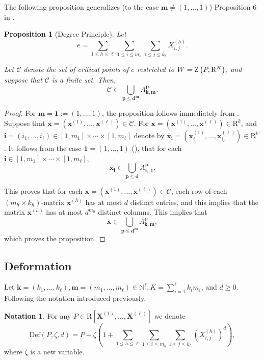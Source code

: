 \documentclass{amsart}
\newtheorem{proposition}{Proposition}
\theoremstyle{definition}
\newtheorem{notation}{Notation}
\theoremstyle{remark}
\numberwithin{equation}{section}
\begin{document}
The following proposition generalizes (to the case ${\mathbf{m}} \neq (1,\ldots,1)$) 
Proposition 6 in \cite{BC2013}. 
\begin{proposition}[Degree Principle]
  \label{prop:half-degree}
  Let 
  \[
  e =\sum_{1 \leq h \leq \ell} \sum_{1 \leq i \leq m_h}\sum_{1 \leq j \leq k_h}
X^{(h)}_{i,j}. 
\]

Let $\mathcal{C}$ denote the set of critical points of $e$ restricted to 
$W= {{\rm Z}} \left(P, {\mathrm{R}}^{K}\right)$, and suppose that $\mathcal{C}$ is a finite set. Then, 
\[
\mathcal{C} \subset \bigcup_{\mathbf{p} \leq {\mathbf{d}}^{\mathbf{m}}} A^{\mathbf{p}}_{{\mathbf{k}},{\mathbf{m}}}.
\] 
\end{proposition}
\begin{proof}
For ${\mathbf{m}}= \mathbf{1} := (1,\ldots,1) $, the proposition follows immediately from \cite[Proposition 6]{BC2013}.
Suppose that 
${\mathbf{x}} = ({\mathbf{x}}^{(1)},\ldots,{\mathbf{x}}^{(\ell)}) \in \mathcal{C}$. 
For ${\mathbf{x}} = ({\mathbf{x}}^{(1)},\ldots,{\mathbf{x}}^{(\ell)}) \in {\mathrm{R}}^k$,
and $\mathbf{i} = (i_1,\ldots,i_\ell) \in [1,m_1] \times \cdots \times [1,m_\ell] $ 
denote by $\bar{\mathbf{x}}_{\mathbf{i}} =({\mathbf{x}}^{(1)}_{i_1},\ldots,{\mathbf{x}}^{(\ell)}_{i_\ell}) \in {\mathrm{R}}^{k'}$.
It follows from the case $\mathbf{1}= (1,\ldots,1) $ (\cite[Proposition 6]{BC2013}), that 
for each $\mathbf{i} \in [1,m_1] \times \cdots \times [1,m_\ell]$,
\[
{\mathbf{x}}_{\mathbf{i}} \in \bigcup_{\mathbf{p} \leq {\mathbf{d}}} A^{\mathbf{p}}_{{\mathbf{k}},\mathbf{1}}.
\]

This proves that for each ${\mathbf{x}}  = ({\mathbf{x}}^{(1)},\ldots,{\mathbf{x}}^{(\ell)}) \in \mathcal{C}$,
each row of each $(m_h \times k_h)$-matrix ${\mathbf{x}}^{(h)}$ has at most $d$ distinct entries,
and this implies that the matrix ${\mathbf{x}}^{(h)}$ has at most $d^{m_h}$ distinct columns.
This implies that  
\[
{\mathbf{x}} \in \bigcup_{\mathbf{p} \leq {\mathbf{d}}^{\mathbf{m}}} A^{\mathbf{p}}_{{\mathbf{k}},{\mathbf{m}}},
\] 
which proves the proposition.
\end{proof}

\subsection{Deformation}
\label{subsec:deformation}
Let ${\mathbf{k}} =(k_1,\ldots,k_\ell),{\mathbf{m}}=(m_1,\ldots,m_\ell) \in {\mathbb{N}}^\ell, K = \sum_{i=1}^\ell k_i m_i$, and $d \geq 0$. Following the notation introduced previously,
\begin{notation}
  \label{not:def}For any $P \in {\mathrm{R}} [ {\mathbf{X}}^{(1)} , \ldots, {\mathbf{X}}^{(\ell)} ]$ we denote
  \[ {\mathrm{Def}} (P, \zeta ,d) = P -  \zeta   \left(1+ \sum_{1\leq h\leq \ell}\sum_{1\leq i \leq m_h} \sum_{1\leq j\leq k_h}  (X^{(h)}_{i,j})^{d} \right), 
  \]
  where $\zeta$ is a new variable.
\end{notation}
\end{document}
